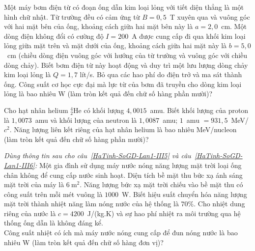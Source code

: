 \begin{ex}
		Một máy bơm điện từ có đoạn ống dẫn kim loại lỏng với tiết diện thẳng là một hình chữ nhật. Từ trường đều có cảm ứng từ $B=0{,}5$~T xuyên qua và vuông góc với hai mặt bên của ống, khoảng cách giữa hai mặt bên này là $a=2{,}0$~cm. Một dòng điện không đổi có cường độ $I=200$~A được cung cấp đi qua khối kim loại lỏng giữa mặt trên và mặt dưới của ống, khoảng cách giữa hai mặt này là $b=5{,}0$~cm (chiều dòng điện vuông góc với hướng của từ trường và vuông góc với chiều dòng chảy). Biết bơm điện từ này hoạt động và duy trì một lưu lượng dòng chảy kim loại lỏng là $Q=1{,}7$ lít/s. Bỏ qua các hao phí do điện trở và ma sát thành ống. Công suất cơ học cực đại mà lực từ của bơm đã truyền cho dòng kim loại lỏng là bao nhiêu W (làm tròn kết quả đến chữ số hàng phần mười)?
		\par
	\end{ex}

	\begin{ex}%
		Cho hạt nhân helium ${}^4_2\text{He}$ có khối lượng $4{,}0015$~amu. Biết khối lượng của proton là $1{,}0073$~amu và khối lượng của neutron là $1{,}0087$~amu; $1$~amu $=931{,}5$~MeV/$c^2$. Năng lượng liên kết riêng của hạt nhân helium là bao nhiêu MeV/nucleon (làm tròn kết quả đến chữ số hàng phần mười)?
		\par
	\end{ex}

	\begin{ex}%
		\label{HaTinh-SoGD-Lan1-III5}
		\textit{Dùng thông tin sau cho câu~\ref{HaTinh-SoGD-Lan1-III5} và câu~\ref{HaTinh-SoGD-Lan1-III6}:} Một gia đình sử dụng máy nước nóng năng lượng mặt trời loại ống chân không để cung cấp nước sinh hoạt. Diện tích bề mặt thu bức xạ ánh sáng mặt trời của máy là $6~\text{m}^2$. Năng lượng bức xạ mặt trời chiếu vào bề mặt thu có công suất trên mỗi mét vuông là $1000$~W. Biết hiệu suất chuyển hóa năng lượng mặt trời thành nhiệt năng làm nóng nước của hệ thống là $70\%$. Cho nhiệt dung riêng của nước là $c=4200$~J/(kg.K) và sự hao phí nhiệt ra môi trường qua hệ thống ống dẫn là không đáng kể.\\
		Công suất nhiệt có ích mà máy nước nóng cung cấp để đun nóng nước là bao nhiêu W (làm tròn kết quả đến chữ số hàng đơn vị)?
		\par
	\end{ex}

